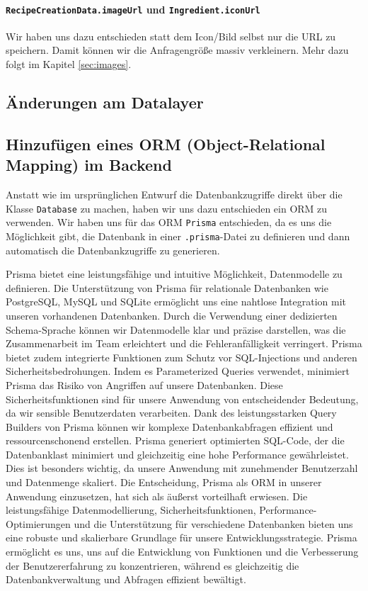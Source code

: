 \documentclass{implementierungsheft}
\begin{document}
\paragraph{\texttt{RecipeCreationData.imageUrl} und \texttt{Ingredient.iconUrl}} Wir haben uns dazu entschieden statt dem Icon/Bild selbst nur die URL zu speichern. Damit können wir die Anfragengröße massiv verkleinern. Mehr dazu folgt im Kapitel \ref{sec:images}.
\subsection{Änderungen am Datalayer}

\subsection{Hinzufügen eines ORM (Object-Relational Mapping) im Backend}
Anstatt wie im ursprünglichen Entwurf die Datenbankzugriffe direkt über die Klasse \texttt{Database} zu machen, haben wir uns dazu entschieden ein ORM zu verwenden.
Wir haben uns für das ORM \texttt{Prisma} entschieden, da es uns die Möglichkeit gibt, die Datenbank in einer \texttt{.prisma}-Datei zu definieren und dann automatisch die Datenbankzugriffe zu generieren.

Prisma bietet eine leistungsfähige und intuitive Möglichkeit, Datenmodelle zu definieren. Die Unterstützung von Prisma für relationale Datenbanken wie PostgreSQL, MySQL und SQLite ermöglicht uns eine nahtlose Integration mit unseren vorhandenen Datenbanken. Durch die Verwendung einer dedizierten Schema-Sprache können wir Datenmodelle klar und präzise darstellen, was die Zusammenarbeit im Team erleichtert und die Fehleranfälligkeit verringert.
Prisma bietet zudem integrierte Funktionen zum Schutz vor SQL-Injections und anderen Sicherheitsbedrohungen. Indem es Parameterized Queries verwendet, minimiert Prisma das Risiko von Angriffen auf unsere Datenbanken. Diese Sicherheitsfunktionen sind für unsere Anwendung von entscheidender Bedeutung, da wir sensible Benutzerdaten verarbeiten.
Dank des leistungsstarken Query Builders von Prisma können wir komplexe Datenbankabfragen effizient und ressourcenschonend erstellen. Prisma generiert optimierten SQL-Code, der die Datenbanklast minimiert und gleichzeitig eine hohe Performance gewährleistet. Dies ist besonders wichtig, da unsere Anwendung mit zunehmender Benutzerzahl und Datenmenge skaliert.
Die Entscheidung, Prisma als ORM in unserer Anwendung einzusetzen, hat sich als äußerst vorteilhaft erwiesen. Die leistungsfähige Datenmodellierung, Sicherheitsfunktionen, Performance-Optimierungen und die Unterstützung für verschiedene Datenbanken bieten uns eine robuste und skalierbare Grundlage für unsere Entwicklungsstrategie. Prisma ermöglicht es uns, uns auf die Entwicklung von Funktionen und die Verbesserung der Benutzererfahrung zu konzentrieren, während es gleichzeitig die Datenbankverwaltung und Abfragen effizient bewältigt.
\end{document}
